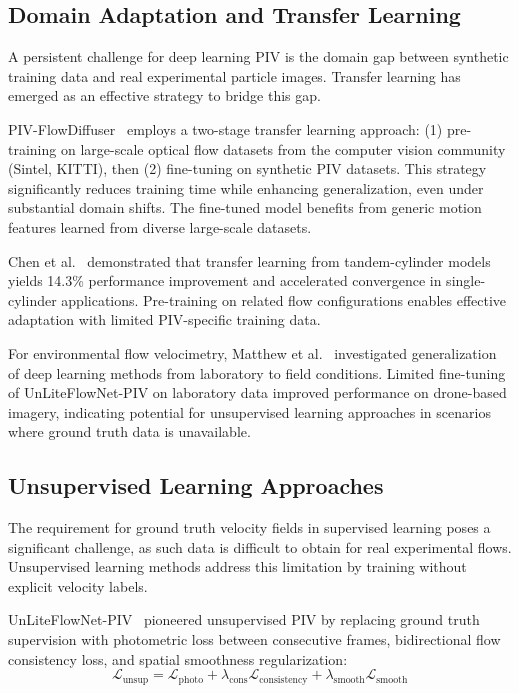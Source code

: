 \subsection{Domain Adaptation and Transfer Learning}

A persistent challenge for deep learning PIV is the domain gap between synthetic training data and real experimental particle images. Transfer learning has emerged as an effective strategy to bridge this gap.

PIV-FlowDiffuser~\cite{zhu2025piv_flowdiffuser} employs a two-stage transfer learning approach: (1) pre-training on large-scale optical flow datasets from the computer vision community (Sintel, KITTI), then (2) fine-tuning on synthetic PIV datasets. This strategy significantly reduces training time while enhancing generalization, even under substantial domain shifts. The fine-tuned model benefits from generic motion features learned from diverse large-scale datasets.

Chen et al.~\cite{chen2025lowcost_piv} demonstrated that transfer learning from tandem-cylinder models yields 14.3\% performance improvement and accelerated convergence in single-cylinder applications. Pre-training on related flow configurations enables effective adaptation with limited PIV-specific training data.

For environmental flow velocimetry, Matthew et al.~\cite{matthew2024environmental_piv} investigated generalization of deep learning methods from laboratory to field conditions. Limited fine-tuning of UnLiteFlowNet-PIV on laboratory data improved performance on drone-based imagery, indicating potential for unsupervised learning approaches in scenarios where ground truth data is unavailable.

\subsection{Unsupervised Learning Approaches}

The requirement for ground truth velocity fields in supervised learning poses a significant challenge, as such data is difficult to obtain for real experimental flows. Unsupervised learning methods address this limitation by training without explicit velocity labels.

UnLiteFlowNet-PIV~\cite{liu2020unliteflownet} pioneered unsupervised PIV by replacing ground truth supervision with photometric loss between consecutive frames, bidirectional flow consistency loss, and spatial smoothness regularization:
\begin{equation}
\mathcal{L}_{\text{unsup}} = \mathcal{L}_{\text{photo}} + \lambda_{\text{cons}}\mathcal{L}_{\text{consistency}} + \lambda_{\text{smooth}}\mathcal{L}_{\text{smooth}}
\end{equation}

